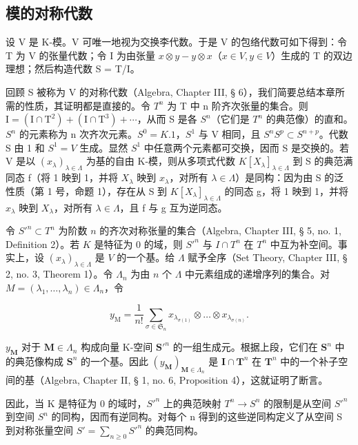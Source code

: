 \subsection{模的对称代数}

设 V 是 K-模。V 可唯一地视为交换李代数。于是 V 的包络代数可如下得到：令 T 为 V 的张量代数；令 I 为由张量 \(x \otimes y - y \otimes x\)（\(x \in V, y \in V\)）生成的 T 的双边理想；然后构造代数 S = T/I。

回顾 S 被称为 V 的对称代数（Algebra, Chapter III, § 6），我们简要总结本章所需的性质，其证明都是直接的。令 \(T^{n}\) 为 T 中 n 阶齐次张量的集合。则 \(\mathrm{I} = (\mathrm{I} \cap \mathrm{T}^{2}) + (\mathrm{I} \cap \mathrm{T}^{3}) + \cdots\)，从而 S 是各 \(S^{n}\)（它们是 \(T^{n}\) 的典范像）的直和。\(S^{n}\) 的元素称为 n 次齐次元素。\(S^{0} = K.1\)，\(S^{1}\) 与 V 相同，且 \(S^{n}S^{p} \subset S^{n+p}\)。代数 S 由 1 和 \(S^{1} = V\) 生成。显然 \(S^{1}\) 中任意两个元素都可交换，因而 S 是交换的。若 V 是以 \((x_{\lambda})_{\lambda \in \Lambda}\) 为基的自由 K-模，则从多项式代数 \(K[X_{\lambda}]_{\lambda \in \Lambda}\) 到 S 的典范满同态 f（将 1 映到 1，并将 \(X_{\lambda}\) 映到 \(x_{\lambda}\)，对所有 \(\lambda \in \Lambda\)）是同构：因为由 S 的泛性质（第 1 号，命题 1），存在从 S 到 \(K[X_{\lambda}]_{\lambda \in \Lambda}\) 的同态 g，将 1 映到 1，并将 \(x_{\lambda}\) 映到 \(X_{\lambda}\)，对所有 \(\lambda \in \Lambda\)，且 f 与 g 互为逆同态。

令 \(S'^{n} \subset T^n\) 为阶数 \(n\) 的齐次对称张量的集合（Algebra, Chapter III, § 5, no. 1, Definition 2）。若 \(K\) 是特征为 0 的域，则 \(S'^{n}\) 与 \(I \cap T^n\) 在 \(T^n\) 中互为补空间。事实上，设 \((x_{\lambda})_{\lambda \in \Lambda}\) 是 \(V\) 的一个基。给 \(\Lambda\) 赋予全序（Set Theory, Chapter III, § 2, no. 3, Theorem 1）。令 \(\Lambda_n\) 为由 \(n\) 个 \(\Lambda\) 中元素组成的递增序列的集合。对 \(M = (\lambda_1, \ldots, \lambda_n) \in \Lambda_n\)，令

\[
y _ {\mathrm{M}} = \frac {1}{n !} \sum_ {\sigma \in \mathfrak {S} _ {n}} x _ {\lambda_ {\sigma (1)}} \otimes \dots \otimes x _ {\lambda_ {\sigma (n)}}.
\]

\(y_{\mathbf{M}}\) 对于 \(\mathbf{M} \in \Lambda_n\) 构成向量 K-空间 \(\mathbf{S}'^n\) 的一组生成元。根据上段，它们在 \(\mathbf{S}^n\) 中的典范像构成 \(\mathbf{S}^n\) 的一个基。因此 \((y_{\mathbf{M}})_{\mathbf{M} \in \Lambda_n}\) 是 \(\mathbf{I} \cap \mathbf{T}^n\) 在 \(\mathbf{T}^n\) 中的一个补子空间的基（Algebra, Chapter II, § 1, no. 6, Proposition 4），这就证明了断言。

因此，当 K 是特征为 0 的域时，\(S'^{n}\) 上的典范映射 \(T^{n} \rightarrow S^{n}\) 的限制是从空间 \(S'^{n}\) 到空间 \(S^{n}\) 的同构，因而有逆同构。对每个 n 得到的这些逆同构定义了从空间 S 到对称张量空间 \(S' = \sum_{n \geqslant 0} S'^{n}\) 的典范同构。

